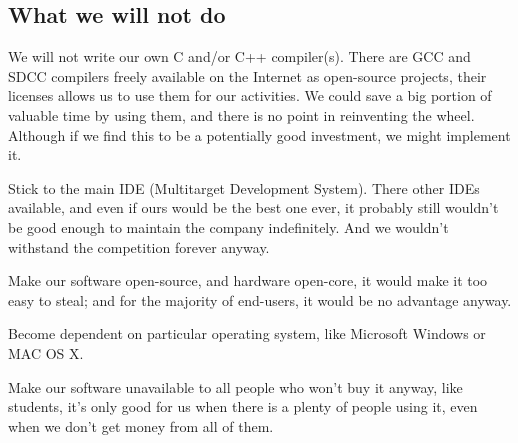 \documentclass[a4paper,twoside,15pt]{book}
\begin{document}
		\subsection{What we will not do}
			\begin{dinglist}{73}
				\item We will not write our own C and/or C++ compiler(s). There are GCC and SDCC compilers freely available on the Internet as open-source projects, their licenses allows us to use them for our activities. We could save a big portion of valuable time by using them, and there is no point in reinventing the wheel. Although if we find this to be a potentially good investment, we might implement it.
				\item Stick to the main IDE (Multitarget Development System). There other IDEs available, and even if ours would be the best one ever, it probably still wouldn't be good enough to maintain the company indefinitely. And we wouldn't withstand the competition forever anyway.
				\item Make our software open-source, and hardware open-core, it would make it too easy to steal; and for the majority of end-users, it would be no advantage anyway.
				\item Become dependent on particular operating system, like Microsoft Windows or MAC OS X.
				\item Make our software unavailable to all people who won't buy it anyway, like students, it's only good for us when there is a plenty of people using it, even when we don't get money from all of them.
			\end{dinglist}
\end{document}
